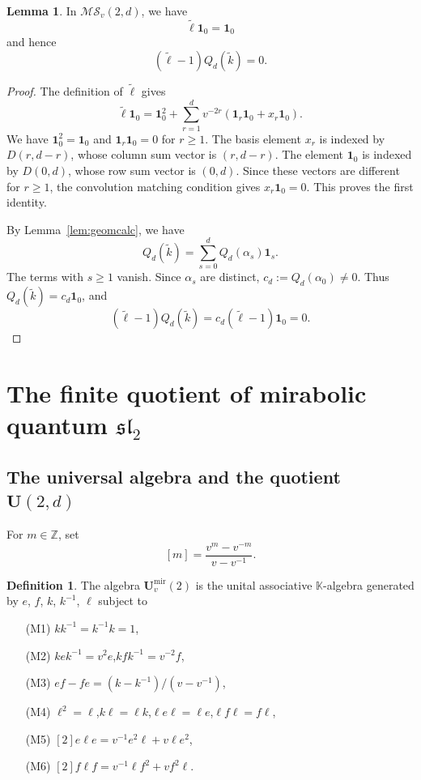 \documentclass[12pt]{amsart}
\numberwithin{equation}{section}
\theoremstyle{definition}
\newtheorem{lemma}[theorem]{Lemma}
\theoremstyle{definition}
\newtheorem{definition}[theorem]{Definition}
\newcommand{\kk}{\mathbb K}
\newcommand{\Umir}{\mathbf U^{\mathrm{mir}}_v(2)}
\newcommand{\MS}{\mathcal{MS}_v(2,d)}
\newcommand{\tk}{\widetilde k}
\newcommand{\tell}{\widetilde\ell}
\begin{document}
\begin{lemma}\label{lem:geombound}
In $\MS$, we have
$$
\tell\mathbf1_0=\mathbf1_0
$$
and hence
$$
(\tell-1)Q_d(\tk)=0.
$$
\end{lemma}
\begin{proof}
    The definition of $\tell$ gives
$$
\tell\mathbf1_0
=\mathbf1_0^2+
\sum_{r=1}^{d}v^{-2r}
(\mathbf1_r\mathbf1_0+x_r\mathbf1_0).
$$
We have $\mathbf1_0^2=\mathbf1_0$ and $\mathbf1_r\mathbf1_0=0$ for $r\ge1$. 
The basis element $x_r$ is indexed by $D(r,d-r)$, whose column sum vector is $(r,d-r)$. The element $\mathbf1_0$ is indexed by $D(0,d)$, whose row sum vector is $(0,d)$. Since these vectors are different for $r\ge1$, the convolution matching condition gives $x_r\mathbf1_0=0$. This proves the first identity.

By Lemma~\ref{lem:geomcalc}, we have 
$$
Q_d(\tk)=\sum_{s=0}^{d}Q_d(\alpha_s)\mathbf1_s.
$$
The terms with $s\ge1$ vanish. Since $\alpha_s$ are distinct, $c_d:=Q_d(\alpha_0)\ne0$. 
Thus $Q_d(\tk)=c_d\mathbf1_0$, and
$$
(\tell-1)Q_d(\tk)=c_d(\tell-1)\mathbf1_0=0.  
$$
\end{proof}

\section{The finite quotient of mirabolic quantum \texorpdfstring{$\mathfrak{sl}_2$}{sl2}}\label{sec:quot}

\subsection{The universal algebra and the quotient \texorpdfstring{$\textbf{U}(2,d)$}{Ufd}}\label{subsec:univ}

For $m\in\mathbb Z$, set
$$
[m]=\frac{v^m-v^{-m}}{v-v^{-1}}.
$$

\begin{definition}
    The algebra $\Umir$ is the unital associative $\kk$-algebra generated by $e$, $f$, $k$, $k^{-1}$, $\ell$ subject to
    \begin{enumerate}
        \item[(M1)] $kk^{-1}=k^{-1}k=1$,

        \item[(M2)] $kek^{-1}=v^2e$,\qquad $kfk^{-1}=v^{-2}f$,

        \item[(M3)] $ef-fe=(k-k^{-1})/(v-v^{-1})$,

        \item[(M4)] $\ell^2=\ell$,\qquad $k\ell=\ell k$,\qquad $\ell e\ell=\ell e$,\qquad $\ell f\ell=f\ell$,

        \item[(M5)]  ${[2]}e\ell e=v^{-1}e^2\ell+v\ell e^2$,

        \item[(M6)] ${[2]}f\ell f=v^{-1}\ell f^2+vf^2\ell$.
    \end{enumerate}
\end{definition}
\end{document}
